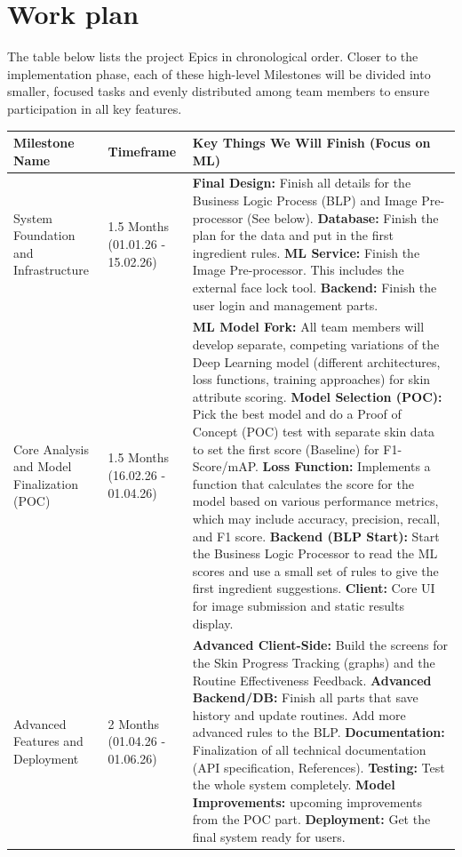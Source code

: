 \documentclass[12pt,a4paper]{article}
\begin{document}
\section{Work plan}
The table below lists the project Epics in chronological order. Closer to the implementation phase, each of these high-level Milestones will be divided into smaller, focused tasks and evenly distributed among team members to ensure participation in all key features.

\begin{table}[h]
\centering
\begin{tabularx}{\textwidth}{|l|l|X|}
\hline
\textbf{Milestone Name} & \textbf{Timeframe} & \textbf{Key Things We Will Finish (Focus on ML)} \\
\hline
System Foundation and Infrastructure & 1.5 Months (01.01.26 - 15.02.26) & \textbf{Final Design:} Finish all details for the Business Logic Process (BLP) and Image Pre-processor (See below). \textbf{Database:} Finish the plan for the data and put in the first ingredient rules. \textbf{ML Service:} Finish the Image Pre-processor. This includes the external face lock tool. \textbf{Backend:} Finish the user login and management parts. \\
\hline
Core Analysis and Model Finalization (POC) & 1.5 Months (16.02.26 - 01.04.26) & \textbf{ML Model Fork:} All team members will develop separate, competing variations of the Deep Learning model (different architectures, loss functions, training approaches) for skin attribute scoring. \textbf{Model Selection (POC):} Pick the best model and do a Proof of Concept (POC) test with separate skin data to set the first score (Baseline) for F1-Score/mAP. \textbf{Loss Function:} Implements a function that calculates the score for the model based on various performance metrics, which may include accuracy, precision, recall, and F1 score. \textbf{Backend (BLP Start):} Start the Business Logic Processor to read the ML scores and use a small set of rules to give the first ingredient suggestions. \textbf{Client:} Core UI for image submission and static results display. \\
\hline
Advanced Features and Deployment & 2 Months (01.04.26 - 01.06.26) & \textbf{Advanced Client-Side:} Build the screens for the Skin Progress Tracking (graphs) and the Routine Effectiveness Feedback. \textbf{Advanced Backend/DB:} Finish all parts that save history and update routines. Add more advanced rules to the BLP. \textbf{Documentation:} Finalization of all technical documentation (API specification, References). \textbf{Testing:} Test the whole system completely. \textbf{Model Improvements:} upcoming improvements from the POC part. \textbf{Deployment:} Get the final system ready for users. \\
\hline
\end{tabularx}
\end{table}
\end{document}
